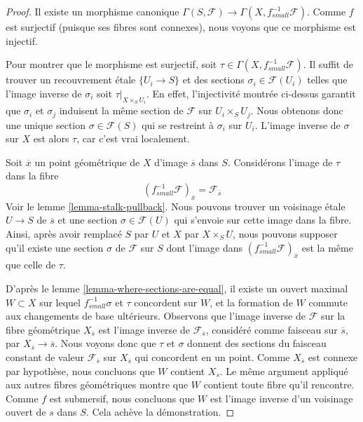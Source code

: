 \begin{proof}
Il existe un morphisme canonique
$\Gamma(S, \mathcal{F}) \to \Gamma(X, f_{small}^{-1}\mathcal{F})$.
Comme $f$ est surjectif (puisque ses fibres sont connexes), nous voyons que
ce morphisme est injectif.

\medskip\noindent
Pour montrer que le morphisme est surjectif, soit
$\tau \in \Gamma(X, f_{small}^{-1}\mathcal{F})$.
Il suffit de trouver
un recouvrement \'etale $\{U_i \to S\}$ et des
sections $\sigma_i \in \mathcal{F}(U_i)$
telles que l'image inverse de $\sigma_i$ soit $\tau|_{X \times_S U_i}$.
En effet, l'injectivit\'e montr\'ee ci-dessus garantit
que $\sigma_i$ et $\sigma_j$ induisent la m\^eme
section de $\mathcal{F}$ sur $U_i \times_S U_j$.
Nous obtenons donc une unique section $\sigma \in \mathcal{F}(S)$
qui se restreint \`a $\sigma_i$ sur $U_i$.
L'image inverse de $\sigma$ sur $X$ est alors $\tau$,
car c'est vrai localement.

\medskip\noindent
Soit $\overline{x}$ un point g\'eom\'etrique de $X$ d'image $\overline{s}$
dans $S$. Consid\'erons l'image de $\tau$ dans la fibre
$$
(f_{small}^{-1}\mathcal{F})_{\overline{x}} = \mathcal{F}_{\overline{s}}
$$
Voir le lemme \ref{lemma-stalk-pullback}.
Nous pouvons trouver un voisinage \'etale $U \to S$ de $\overline{s}$
et une section $\sigma \in \mathcal{F}(U)$ qui s'envoie sur cette image
dans la fibre. Ainsi, apr\`es avoir remplac\'e $S$ par $U$ et $X$ par $X \times_S U$,
nous pouvons supposer qu'il existe une section $\sigma$ de $\mathcal{F}$ sur $S$
dont l'image dans $(f_{small}^{-1}\mathcal{F})_{\overline{x}}$ est la
m\^eme que celle de $\tau$.

\medskip\noindent
D'apr\`es le lemme \ref{lemma-where-sections-are-equal},
il existe un ouvert maximal $W \subset X$ sur lequel
$f_{small}^{-1}\sigma$ et $\tau$ concordent sur $W$,
et la formation de $W$ commute aux changements de base ult\'erieurs.
Observons que l'image inverse de $\mathcal{F}$ sur la
fibre g\'eom\'etrique $X_{\overline{s}}$ est l'image inverse
de $\mathcal{F}_{\overline{s}}$, consid\'er\'e comme faisceau sur
$\overline{s}$, par $X_{\overline{s}} \to \overline{s}$.
Nous voyons donc que $\tau$ et $\sigma$ donnent des sections
du faisceau constant de valeur $\mathcal{F}_{\overline{s}}$
sur $X_{\overline{s}}$ qui concordent en un point. Comme
$X_{\overline{s}}$ est connexe par hypoth\`ese, nous concluons
que $W$ contient $X_s$. Le m\^eme argument appliqu\'e aux autres
fibres g\'eom\'etriques montre que $W$ contient toute fibre qu'il rencontre.
Comme $f$ est submersif, nous concluons que $W$ est l'image
inverse d'un voisinage ouvert de $s$ dans $S$.
Cela ach\`eve la d\'emonstration.
\end{proof}

